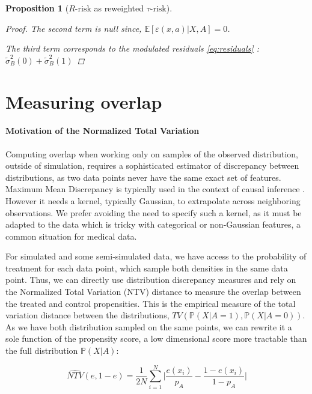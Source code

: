 \documentclass[french,12pt,twoside,a4paper]{book}
\newtheorem{proposition*}{Proposition}
\newtheorem{proof}{Proof}
\begin{document}
\begin{appendices}
\begin{proposition*}[$R\text{-risk}$ as reweighted $\tau
        \text{-risk}$]
\begin{proof}
      The second term is null since, $\mathbb E[\varepsilon(x, a) |X, A]=0$.

      The third term corresponds to the modulated residuals \ref{eq:residuals} :
      $\tilde{\sigma}_B^2(0) + \tilde{\sigma}_B^2(1)$

    \end{proof}
  \end{proposition*}

  \section{Measuring overlap}\label{apd:motivation_ntv}

  \paragraph{Motivation of the Normalized Total Variation}
  Computing overlap when working only on samples of the observed distribution,
  outside of simulation, requires a sophisticated estimator of discrepancy
  between distributions, as two data points never have the same exact set of
  features. Maximum Mean Discrepancy \citep{gretton2012kernel} is typically
  used in the context of causal inference
  \citep{shalit_estimating_2017,johansson2022generalization}. However it
  needs a kernel, typically Gaussian, to extrapolate across neighboring
  observations. We prefer avoiding the need to specify such a kernel, as it must
  be adapted to the data which is tricky with categorical or non-Gaussian
  features, a common situation for medical data.

  For simulated and some semi-simulated data, we have access to the probability of
  treatment for each data point, which sample both densities in the same data
  point. Thus, we can directly use distribution discrepancy measures and rely on
  the Normalized Total Variation (NTV) distance to measure the overlap between the
  treated and control propensities. This is the empirical measure of the total
  variation distance \citep{sriperumbudur_integral_2009} between the distributions,
  $TV(\mathbb{P}(X|A=1), \mathbb{P}(X|A=0))$. As we have both distribution sampled
  on the same points, we can rewrite it a sole function of the propensity score, a
  low dimensional score more tractable than the full distribution $\mathbb
    P(X|A)$:

  \begin{equation}\label{eq:ntv}
    \widehat{NTV}(e, 1-e) = \frac{1}{2N} \sum_{i =1}^{N} \big |\frac{e(x_i)}{p_A}-\frac{1-e(x_i)}{1-{p_A}} \big |
  \end{equation}


\end{appendices}
\end{document}
